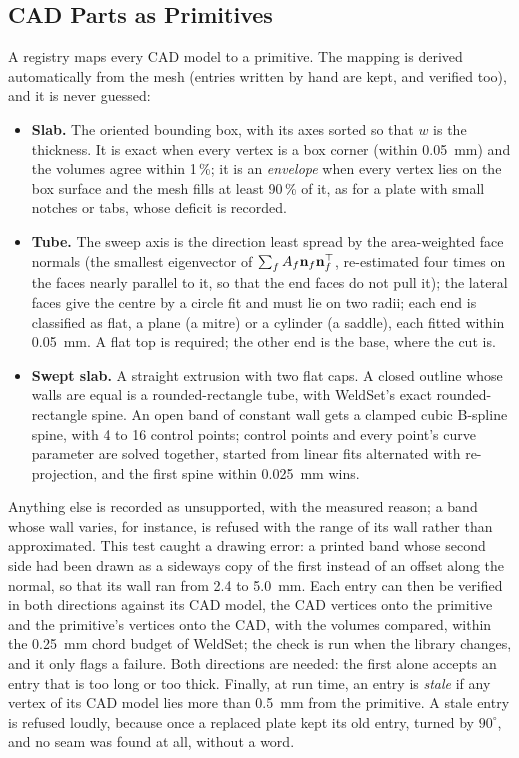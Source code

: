 \subsection{CAD Parts as Primitives}
\label{sec:mc_registry}
A registry maps every CAD model to a primitive. The mapping is derived automatically from the mesh
(entries written by hand are kept, and verified too), and it is never guessed:
\begin{itemize}
\item \textbf{Slab.} The oriented bounding box, with its axes sorted so that $w$ is the thickness. It
  is exact when every vertex is a box corner (within 0.05~mm) and the volumes agree within 1\,\%; it is
  an \emph{envelope} when every vertex lies on the box surface and the mesh fills at least 90\,\% of
  it, as for a plate with small notches or tabs, whose deficit is recorded.
\item \textbf{Tube.} The sweep axis is the direction least spread by the area-weighted face normals
  (the smallest eigenvector of $\sum_fA_f\mathbf{n}_f\mathbf{n}_f^{\top}$, re-estimated four times on the
  faces nearly parallel to it, so that the end faces do not pull it); the lateral faces give the centre
  by a circle fit and must lie on two radii; each end is classified as flat, a plane (a mitre) or a
  cylinder (a saddle), each fitted within 0.05~mm. A flat top is required; the other end is the base,
  where the cut is.
\item \textbf{Swept slab.} A straight extrusion with two flat caps. A closed outline whose walls are
  equal is a rounded-rectangle tube, with WeldSet's exact rounded-rectangle spine. An open band of
  constant wall gets a clamped cubic B-spline spine, with 4 to 16 control points; control points and
  every point's curve parameter are solved together, started from linear fits alternated with
  re-projection, and the first spine within 0.025~mm wins.
\end{itemize}
Anything else is recorded as unsupported, with the measured reason; a band whose wall varies, for
instance, is refused with the range of its wall rather than approximated. This test caught a drawing
error: a printed band whose second side had been drawn as a sideways copy of the first instead of an
offset along the normal, so that its wall ran from 2.4 to 5.0~mm. Each entry can then be verified in
both directions against its CAD model, the CAD vertices onto the primitive and the primitive's
vertices onto the CAD, with the volumes compared, within the 0.25~mm chord budget of WeldSet; the
check is run when the library changes, and it only flags a failure. Both directions are needed: the
first alone accepts an entry that is too long or too thick. Finally, at run time, an entry is \emph{stale} if any vertex of
its CAD model lies more than 0.5~mm from the primitive. A stale entry is refused loudly, because once a
replaced plate kept its old entry, turned by $90^\circ$, and no seam was found at all, without a word.

